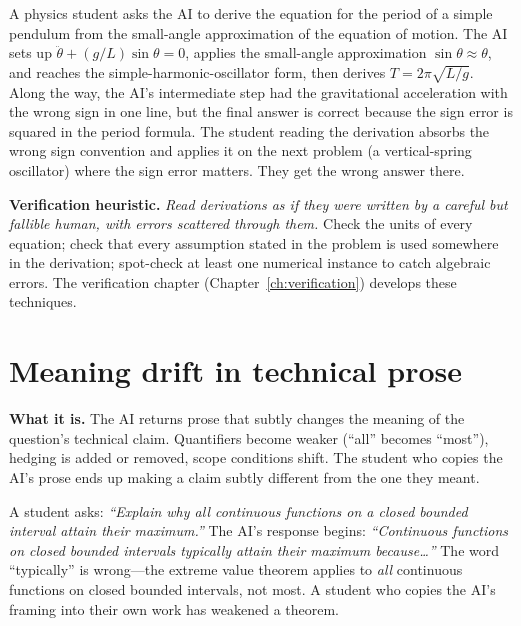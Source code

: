 \documentclass[11pt]{book}
\begin{document}
\begin{example}
A physics student asks the AI to derive the equation for the period of a simple pendulum from the small-angle approximation of the equation of motion. The AI sets up $\ddot\theta + (g/L)\sin\theta = 0$, applies the small-angle approximation $\sin\theta \approx \theta$, and reaches the simple-harmonic-oscillator form, then derives $T = 2\pi\sqrt{L/g}$. Along the way, the AI's intermediate step had the gravitational acceleration with the wrong sign in one line, but the final answer is correct because the sign error is squared in the period formula. The student reading the derivation absorbs the wrong sign convention and applies it on the next problem (a vertical-spring oscillator) where the sign error matters. They get the wrong answer there.
\end{example}

\textbf{Verification heuristic.} \emph{Read derivations as if they were written by a careful but fallible human, with errors scattered through them.} Check the units of every equation; check that every assumption stated in the problem is used somewhere in the derivation; spot-check at least one numerical instance to catch algebraic errors. The verification chapter (Chapter~\ref{ch:verification}) develops these techniques.

\section{Meaning drift in technical prose}
\label{sec:meaning-drift}

\textbf{What it is.} The AI returns prose that subtly changes the meaning of the question's technical claim. Quantifiers become weaker (``all'' becomes ``most''), hedging is added or removed, scope conditions shift. The student who copies the AI's prose ends up making a claim subtly different from the one they meant.

\begin{example}
A student asks: \emph{``Explain why all continuous functions on a closed bounded interval attain their maximum.''} The AI's response begins: \emph{``Continuous functions on closed bounded intervals typically attain their maximum because\ldots''} The word ``typically'' is wrong---the extreme value theorem applies to \emph{all} continuous functions on closed bounded intervals, not most. A student who copies the AI's framing into their own work has weakened a theorem.
\end{example}
\end{document}
